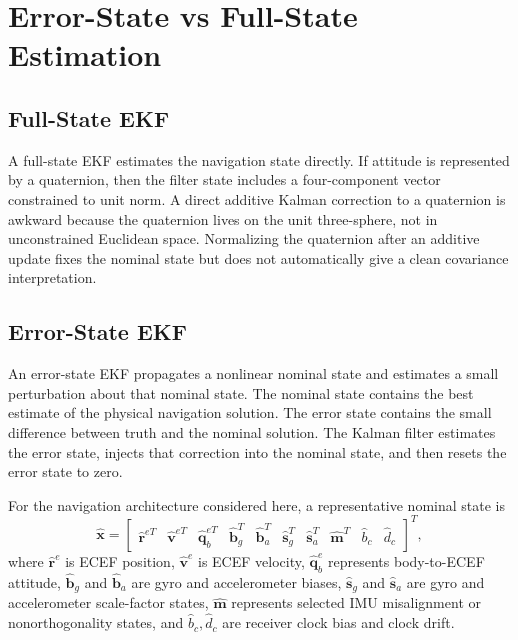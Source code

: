 \documentclass[11pt,oneside]{book}
\newcommand{\quat}{\mathbf{q}}
\newcommand{\xb}{\mathbf{x}}
\newcommand{\vb}{\mathbf{v}}
\newcommand{\rb}{\mathbf{r}}
\newcommand{\bb}{\mathbf{b}}
\begin{document}
\section{Error-State vs Full-State Estimation}

\subsection{Full-State EKF}
A full-state EKF estimates the navigation state directly. If attitude is represented by a quaternion, then the filter state includes a four-component vector constrained to unit norm. A direct additive Kalman correction to a quaternion is awkward because the quaternion lives on the unit three-sphere, not in unconstrained Euclidean space. Normalizing the quaternion after an additive update fixes the nominal state but does not automatically give a clean covariance interpretation.

\subsection{Error-State EKF}
An error-state EKF propagates a nonlinear nominal state and estimates a small perturbation about that nominal state. The nominal state contains the best estimate of the physical navigation solution. The error state contains the small difference between truth and the nominal solution. The Kalman filter estimates the error state, injects that correction into the nominal state, and then resets the error state to zero.

For the navigation architecture considered here, a representative nominal state is
\begin{equation}
\hat{\xb} =
\begin{bmatrix}
\hat{\rb}^{eT} &
\hat{\vb}^{eT} &
\hat{\quat}_{b}^{eT} &
\hat{\bb}_{g}^{T} &
\hat{\bb}_{a}^{T} &
\hat{\mathbf{s}}_{g}^{T} &
\hat{\mathbf{s}}_{a}^{T} &
\hat{\mathbf{m}}^{T} &
\hat b_c &
\hat d_c
\end{bmatrix}^{T},
\label{eq:nominal_state_ch1}
\end{equation}
where \(\hat{\rb}^{e}\) is ECEF position, \(\hat{\vb}^{e}\) is ECEF velocity, \(\hat{\quat}_{b}^{e}\) represents body-to-ECEF attitude, \(\hat{\bb}_{g}\) and \(\hat{\bb}_{a}\) are gyro and accelerometer biases, \(\hat{\mathbf{s}}_{g}\) and \(\hat{\mathbf{s}}_{a}\) are gyro and accelerometer scale-factor states, \(\hat{\mathbf{m}}\) represents selected IMU misalignment or nonorthogonality states, and \(\hat b_c, \hat d_c\) are receiver clock bias and clock drift.
\end{document}
